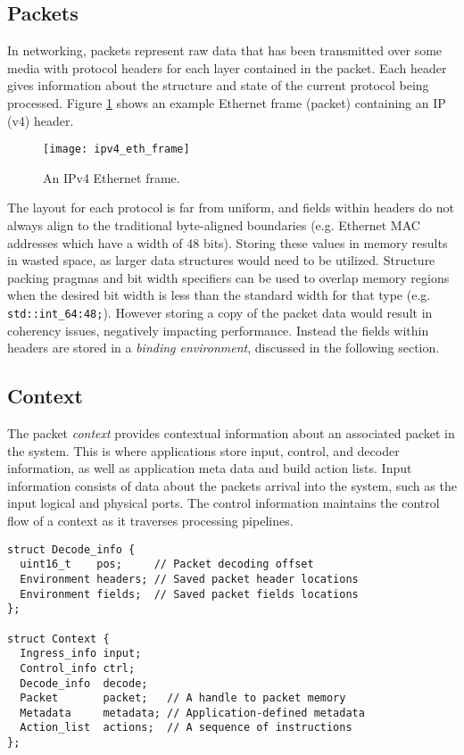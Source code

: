 \subsection{Packets}
In networking, packets represent raw data that has been transmitted over some
media with protocol headers for each layer contained in the packet. Each header
gives information about the structure and state of the current protocol being
processed. Figure \ref{ipv4_eth_frame} shows an example Ethernet frame
(packet) containing an IP (v4) header.

\begin{figure}[h]
\centering
\texttt{[image: ipv4\_eth\_frame]}
\caption{An IPv4 Ethernet frame.}
\label{ipv4_eth_frame}
\end{figure}

The layout for each protocol is far from uniform, and fields within headers do
not always align to the traditional byte-aligned boundaries (e.g. Ethernet
MAC addresses which have a width of 48 bits). Storing these values in memory
results in wasted space, as larger data structures would need to be utilized.
Structure packing pragmas and bit width specifiers can be used to overlap
memory regions when the desired bit width is less than the standard width for
that type (e.g. \texttt{std::int\_64:48;}). However storing a copy of the
packet data would result in coherency issues, negatively impacting
performance. Instead the fields within headers are stored in a \emph{binding
environment}, discussed in the following section.

\subsection{Context}
The packet \emph{context} provides contextual information about an associated
packet in the system. This is where applications store input, control, and
decoder information, as well as application meta data and build action lists.
Input information consists of data about the packets arrival into the system,
such as the input logical and physical ports. The control information maintains
the control flow of a context as it traverses processing pipelines.

\begin{lstlisting}
struct Decode_info {
  uint16_t    pos;     // Packet decoding offset
  Environment headers; // Saved packet header locations
  Environment fields;  // Saved packet fields locations
};

struct Context {
  Ingress_info input;
  Control_info ctrl;
  Decode_info  decode;
  Packet       packet;   // A handle to packet memory
  Metadata     metadata; // Application-defined metadata
  Action_list  actions;  // A sequence of instructions
};
\end{lstlisting}

